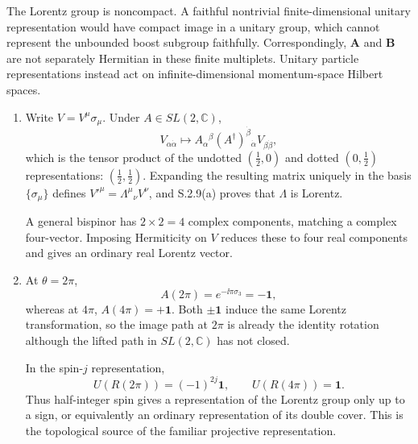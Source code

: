\begin{enumerate}
\begin{enumerate}
The Lorentz group is noncompact.  A faithful nontrivial finite-dimensional
unitary representation would have compact image in a unitary group, which
cannot represent the unbounded boost subgroup faithfully.  Correspondingly,
\(\mathbf A\) and \(\mathbf B\) are not separately Hermitian in these
finite multiplets.  Unitary particle representations instead act on
infinite-dimensional momentum-space Hilbert spaces.
\end{enumerate}

\begin{enumerate}
\item
Write \(V=V^\mu\sigma_\mu\).  Under
\(A\in SL(2,\mathbb C)\),
\[
 V_{\alpha\dot\alpha}\longmapsto
 A_\alpha{}^\beta
 (A^\dagger)^{\dot\beta}{}_{\dot\alpha}
 V_{\beta\dot\beta},
\]
which is the tensor product of the undotted
\((\frac12,0)\) and dotted \((0,\frac12)\) representations:
\((\frac12,\frac12)\).  Expanding the resulting matrix uniquely in the
basis \(\{\sigma_\mu\}\) defines \(V'^\mu=\Lambda^\mu{}_\nu V^\nu\), and
S.2.9(a) proves that \(\Lambda\) is Lorentz.

A general bispinor has \(2\times2=4\) complex components, matching a
complex four-vector.  Imposing Hermiticity on \(V\) reduces these to four
real components and gives an ordinary real Lorentz vector.
\item
At \(\theta=2\pi\),
\[
 A(2\pi)=e^{-\ii\pi\sigma_3}=-\mathbf{1},
\]
whereas at \(4\pi\), \(A(4\pi)=+\mathbf{1}\).  Both
\(\pm\mathbf{1}\) induce the same Lorentz transformation, so the image path
at \(2\pi\) is already the identity rotation although the lifted path in
\(SL(2,\mathbb C)\) has not closed.

In the spin-\(j\) representation,
\[
 U(R(2\pi))=(-1)^{2j}\mathbf{1},\qquad U(R(4\pi))=\mathbf{1}.
\]
Thus half-integer spin gives a representation of the Lorentz group only up
to a sign, or equivalently an ordinary representation of its double cover.
This is the topological source of the familiar projective representation.
\end{enumerate}


\end{enumerate}
